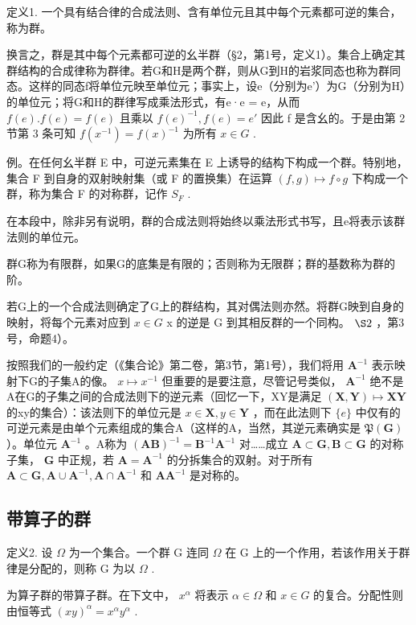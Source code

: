 定义1. 一个具有结合律的合成法则、含有单位元且其中每个元素都可逆的集合，称为群。

换言之，群是其中每个元素都可逆的幺半群（§2，第1号，定义1）。集合上确定其群结构的合成律称为群律。若G和H是两个群，则从G到H的岩浆同态也称为群同态。这样的同态f将单位元映至单位元；事实上，设e（分别为e'）为G（分别为H）的单位元；将G和H的群律写成乘法形式，有e·e = e，从而 \(f(e).f(e) = f(e)\) 且乘以 \(f(e)^{-1}, f(e) = e'\) 因此 f 是含幺的。于是由第 2 节第 3 条可知 \(f(x^{-1}) = f(x)^{-1}\) 为所有 \(x \in G\) .

例。在任何幺半群 E 中，可逆元素集在 E 上诱导的结构下构成一个群。特别地，集合 F 到自身的双射映射集（或 F 的置换集）在运算 \((f, g) \mapsto f \circ g\) 下构成一个群，称为集合 F 的对称群，记作 \(S_{F}\) .

在本段中，除非另有说明，群的合成法则将始终以乘法形式书写，且e将表示该群法则的单位元。

群G称为有限群，如果G的底集是有限的；否则称为无限群；群的基数称为群的阶。

若G上的一个合成法则确定了G上的群结构，其对偶法则亦然。将群G映到自身的映射，将每个元素对应到 \(x \in G\) x 的逆是 G 到其相反群的一个同构。 \(\S 2\) ，第3号，命题4）。

按照我们的一般约定（《集合论》第二卷，第3节，第1号），我们将用 \(\mathbf{A}^{-1}\) 表示映射下G的子集A的像。 \(x \mapsto x^{-1}\) 但重要的是要注意，尽管记号类似， \(\mathbf{A}^{-1}\) 绝不是A在G的子集之间的合成法则下的逆元素（回忆一下，XY是满足 \((\mathbf{X}, \mathbf{Y}) \mapsto \mathbf{XY}\) 的xy的集合）：该法则下的单位元是 \(x \in \mathbf{X}, y \in \mathbf{Y}\) ，而在此法则下 \(\{e\}\) 中仅有的可逆元素是由单个元素组成的集合A（这样的A，当然，其逆元素确实是 \(\mathfrak{P}(\mathbf{G})\) ）。单位元 \(\mathbf{A}^{-1}\) 。A称为 \((\mathbf{AB})^{-1} = \mathbf{B}^{-1}\mathbf{A}^{-1}\) 对……成立 \(\mathbf{A} \subset \mathbf{G}, \mathbf{B} \subset \mathbf{G}\) 的对称子集， \(\mathbf{G}\) 中正规，若 \(\mathbf{A} = \mathbf{A}^{-1}\) 的分拆集合的双射。对于所有 \(\mathbf{A} \subset \mathbf{G}, \mathbf{A} \cup \mathbf{A}^{-1}, \mathbf{A} \cap \mathbf{A}^{-1}\) 和 \(\mathbf{AA}^{-1}\) 是对称的。

\subsection{带算子的群}

定义2. 设 \(\Omega\) 为一个集合。一个群 G 连同 \(\Omega\) 在 G 上的一个作用，若该作用关于群律是分配的，则称 G 为以 \(\Omega\) .

为算子群的带算子群。在下文中， \(x^{\alpha}\) 将表示 \(\alpha\in\Omega\) 和 \(x\in G\) 的复合。分配性则由恒等式 \((xy)^{\alpha}=x^{\alpha}y^{\alpha}\) .

